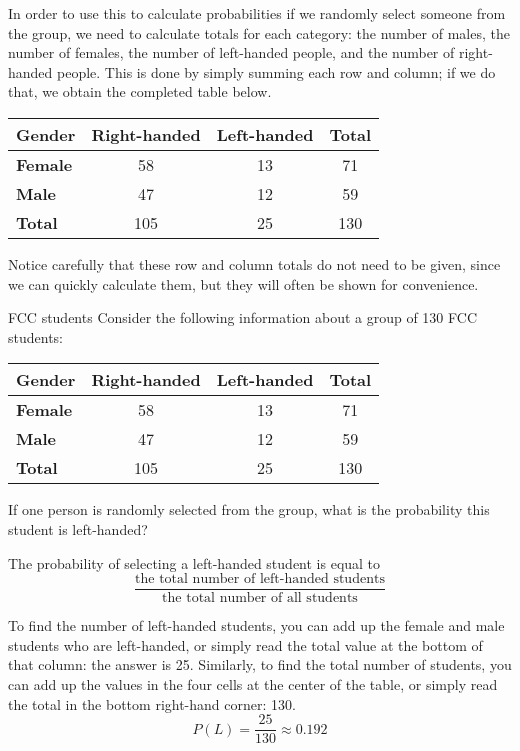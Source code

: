 In order to use this to calculate probabilities if we randomly select someone from the group, we need to calculate totals for each category: the number of males, the number of females, the number of left-handed people, and the number of right-handed people.  This is done by simply summing each row and column; if we do that, we obtain the completed table below.

\begin{center}
\begin{tabular}{l | c c | c}
\textbf{Gender} & \textbf{Right-handed} & \textbf{Left-handed} & \textbf{Total} \\ \hline 
\textbf{Female} & 58 & 13 & 71\\ 
\textbf{Male} & 47 & 12 & 59  \\ \hline
\textbf{Total} & 105 & 25 & 130 \\  
\end{tabular}
\end{center}

Notice carefully that these row and column totals do not need to be given, since we can quickly calculate them, but they will often be shown for convenience.

\begin{example}[https://www.youtube.com/watch?v=1aebOnTckVY]{FCC students}
Consider the following information about a group of 130 FCC students:

\begin{center}
\begin{tabular}{l | c c | c}
\textbf{Gender} & \textbf{Right-handed} & \textbf{Left-handed} & \textbf{Total} \\ \hline 
\textbf{Female} & 58 & 13 & 71\\ 
\textbf{Male} & 47 & 12 & 59  \\ \hline
\textbf{Total} & 105 & 25 & 130 \\  
\end{tabular}
\end{center}

If one person is randomly selected from the group, what is the probability this student is left-handed? 

\sol
The probability of selecting a left-handed student is equal to 
\[\dfrac{\textrm{the total number of left-handed students}}{\textrm{the total number of all students}}\]

To find the number of left-handed students, you can add up the female and male students who are left-handed, or simply read the total value at the bottom of that column: the answer is 25.  Similarly, to find the total number of students, you can add up the values in the four cells at the center of the table, or simply read the total in the bottom right-hand corner: 130.
\[  P(L) = \boxed{\frac{25}{130} \approx 0.192} \]
\end{example}

